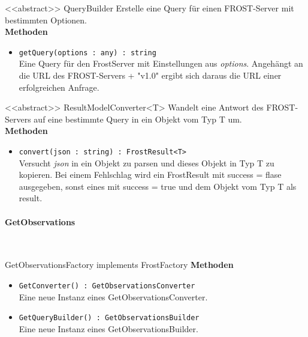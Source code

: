 \begin{Class}{<<abstract>> QueryBuilder}
    Erstelle eine Query für einen FROST-Server mit bestimmten Optionen.
    \bigskip\\
    \textbf{Methoden}
    \begin{itemize}
        \item \texttt{getQuery(options : any) : string}
        \\ Eine Query für den FrostServer mit Einstellungen aus \emph{options}.
        Angehängt an die URL des FROST-Servers + "v1.0" ergibt sich daraus die URL einer erfolgreichen Anfrage.
    \end{itemize}
\end{Class}

\begin{Class}{<<abstract>> ResultModelConverter<T>}
    Wandelt eine Antwort des FROST-Servers auf eine bestimmte Query in ein Objekt vom Typ T um.
    \bigskip\\
    \textbf{Methoden}
    \begin{itemize}
        \item \texttt{convert(json : string) : FrostResult<T>}
        \\ Versucht \emph{json} in ein Objekt zu parsen und dieses Objekt in Typ T zu kopieren.
        Bei einem Fehlschlag wird ein FrostResult mit success = flase ausgegeben, sonst eines mit success = true und dem Objekt vom Typ T als result.
    \end{itemize}
\end{Class}

\paragraph{GetObservations}\mbox{}\\
\begin{Class}{GetObservationsFactory implements FrostFactory}
    \textbf{Methoden}
    \begin{itemize}
        \item \texttt{GetConverter() : GetObservationsConverter}
        \\ Eine neue Instanz eines GetObservationsConverter.
        \item \texttt{GetQueryBuilder() : GetObservationsBuilder}
        \\ Eine neue Instanz eines GetObservationsBuilder.
    \end{itemize}
\end{Class}

